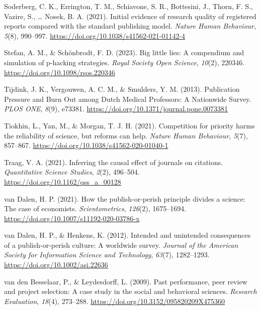 \documentclass[
  ,man,mask,floatsintext]{apa6}
\newlength{\cslhangindent}
\newlength{\cslentryspacingunit} %
\newenvironment{CSLReferences}[2] %
 {%
  \setlength{\parindent}{0pt}
  \ifodd #1
  \let\oldpar\par
  \def\par{\hangindent=\cslhangindent\oldpar}
  \fi
  \setlength{\parskip}{#2\cslentryspacingunit}
 }%
 {}
\begin{document}
\begin{CSLReferences}{1}{0}
\leavevmode{}%
Soderberg, C. K., Errington, T. M., Schiavone, S. R., Bottesini, J., Thorn, F. S., Vazire, S., \ldots{} Nosek, B. A. (2021). Initial evidence of research quality of registered reports compared with the standard publishing model. \emph{Nature Human Behaviour}, \emph{5}(8), 990--997. \url{https://doi.org/10.1038/s41562-021-01142-4}

\leavevmode{}%
Stefan, A. M., \& Schönbrodt, F. D. (2023). Big little lies: A compendium and simulation of p-hacking strategies. \emph{Royal Society Open Science}, \emph{10}(2), 220346. \url{https://doi.org/10.1098/rsos.220346}

\leavevmode{}%
Tijdink, J. K., Vergouwen, A. C. M., \& Smulders, Y. M. (2013). Publication {Pressure} and {Burn Out} among {Dutch Medical Professors}: {A Nationwide Survey}. \emph{PLOS ONE}, \emph{8}(9), e73381. \url{https://doi.org/10.1371/journal.pone.0073381}

\leavevmode{}%
Tiokhin, L., Yan, M., \& Morgan, T. J. H. (2021). Competition for priority harms the reliability of science, but reforms can help. \emph{Nature Human Behaviour}, \emph{5}(7), 857--867. \url{https://doi.org/10.1038/s41562-020-01040-1}

\leavevmode{}%
Traag, V. A. (2021). Inferring the causal effect of journals on citations. \emph{Quantitative Science Studies}, \emph{2}(2), 496--504. \url{https://doi.org/10.1162/qss_a_00128}

\leavevmode{}%
van Dalen, H. P. (2021). How the publish-or-perish principle divides a science: The case of economists. \emph{Scientometrics}, \emph{126}(2), 1675--1694. \url{https://doi.org/10.1007/s11192-020-03786-x}

\leavevmode{}%
van Dalen, H. P., \& Henkens, K. (2012). Intended and unintended consequences of a publish-or-perish culture: {A} worldwide survey. \emph{Journal of the American Society for Information Science and Technology}, \emph{63}(7), 1282--1293. \url{https://doi.org/10.1002/asi.22636}

\leavevmode{}%
van den Besselaar, P., \& Leydesdorff, L. (2009). Past performance, peer review and project selection: A case study in the social and behavioral sciences. \emph{Research Evaluation}, \emph{18}(4), 273--288. \url{https://doi.org/10.3152/095820209X475360}


\end{CSLReferences}
\end{document}
